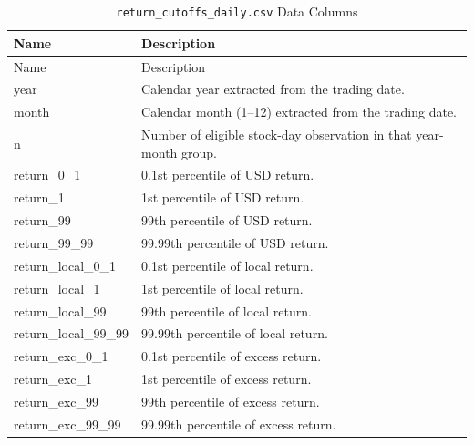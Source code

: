 \documentclass[12pt,title,fleqn]{article}
\begin{document}
{\scriptsize
	\begin{longtable}{@{\extracolsep{\fill}}|l|m{14.2cm}|@{}}
	\caption{\texttt{return\_cutoffs\_daily.csv} Data Columns \label{return-cutoffs-daily}}\\
	
	\hline
	Name & Description \\
	\hline
	\endfirsthead
	
	\hline
	Name & Description \\
	\hline
	\endhead
	
	\hline
	\endfoot
	
	
	\hline\hline
	\endlastfoot
    
    year\rule{0pt}{10pt} & Calendar year extracted from the trading date. \\[1ex]

    month & Calendar month (1–12) extracted from the trading date. \\[1ex]

    n & Number of eligible stock-day observation in that year-month group. \\[1ex]

    return\_0\_1 & 0.1st percentile of USD return. \\[1ex]

    return\_1 & 1st percentile of USD return. \\[1ex]
    
    return\_99 & 99th percentile of USD return. \\[1ex]

    return\_99\_99 & 99.99th percentile of USD return. \\[1ex]

    return\_local\_0\_1 & 0.1st percentile of local return. \\[1ex]

    return\_local\_1 & 1st percentile of local return. \\[1ex]
    
    return\_local\_99 & 99th percentile of local return. \\[1ex]

    return\_local\_99\_99 & 99.99th percentile of local return. \\[1ex]

    return\_exc\_0\_1 & 0.1st percentile of excess return. \\[1ex]

    return\_exc\_1 & 1st percentile of excess return. \\[1ex]
    
    return\_exc\_99 & 99th percentile of excess return. \\[1ex]

    return\_exc\_99\_99 & 99.99th percentile of excess return. \\[1ex]

\end{longtable}}
	
\end{document}
